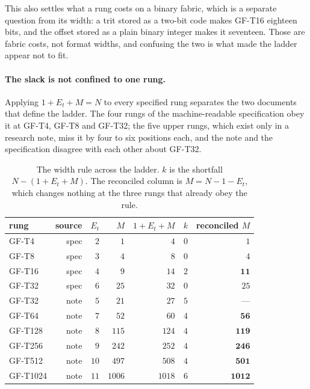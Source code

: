 \documentclass[11pt]{article}
\theoremstyle{definition}
\begin{document}
This also settles what a rung costs on a binary fabric, which is a separate
question from its width: a trit stored as a two-bit code makes GF-T16 eighteen
bits, and the offset stored as a plain binary integer makes it seventeen. Those
are fabric costs, not format widths, and confusing the two is what made the
ladder appear not to fit.

\paragraph{The slack is not confined to one rung.} Applying $1 + E_t + M = N$ to
every specified rung separates the two documents that define the ladder. The four
rungs of the machine-readable specification obey it at GF-T4, GF-T8 and GF-T32;
the five upper rungs, which exist only in a research note, miss it by four to six
positions each, and the note and the specification disagree with each other about
GF-T32.

\begin{table}[t]\centering
\caption{The width rule across the ladder. $k$ is the shortfall
$N - (1 + E_t + M)$. The reconciled column is $M = N - 1 - E_t$, which changes
nothing at the three rungs that already obey the rule.}
\label{tab:ladder-sweep}
\begin{tabular}{lrrrrrr}
\toprule
rung & source & $E_t$ & $M$ & $1{+}E_t{+}M$ & $k$ & reconciled $M$ \\
\midrule
GF-T4    & spec & $2$  & $1$    & $4$    & $0$ & $1$ \\
GF-T8    & spec & $3$  & $4$    & $8$    & $0$ & $4$ \\
GF-T16   & spec & $4$  & $9$    & $14$   & $2$ & $\mathbf{11}$ \\
GF-T32   & spec & $6$  & $25$   & $32$   & $0$ & $25$ \\
GF-T32   & note & $5$  & $21$   & $27$   & $5$ & --- \\
GF-T64   & note & $7$  & $52$   & $60$   & $4$ & $\mathbf{56}$ \\
GF-T128  & note & $8$  & $115$  & $124$  & $4$ & $\mathbf{119}$ \\
GF-T256  & note & $9$  & $242$  & $252$  & $4$ & $\mathbf{246}$ \\
GF-T512  & note & $10$ & $497$  & $508$  & $4$ & $\mathbf{501}$ \\
GF-T1024 & note & $11$ & $1006$ & $1018$ & $6$ & $\mathbf{1012}$ \\
\bottomrule
\end{tabular}
\end{table}
\end{document}
